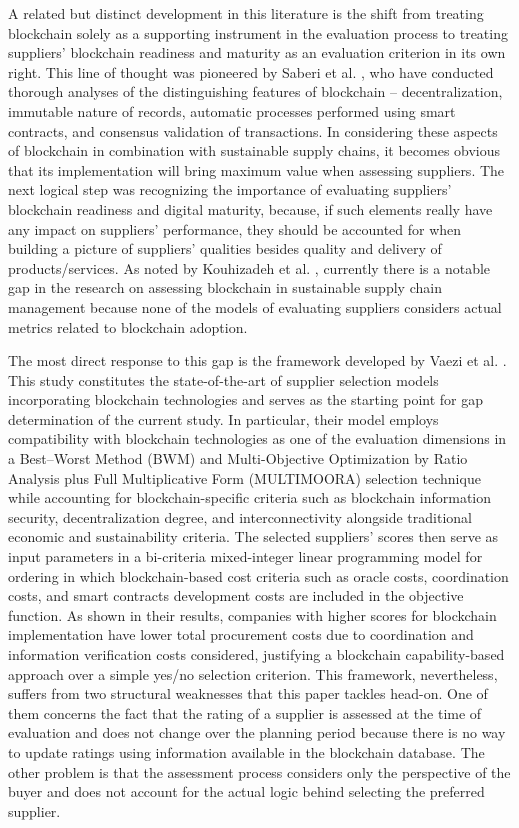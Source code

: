 \documentclass[11pt]{article}
\begin{document}
A related but distinct development in this literature is the shift from treating blockchain solely as a supporting instrument in the evaluation process to treating suppliers' blockchain readiness and maturity as an evaluation criterion in its own right. This line of thought was pioneered by Saberi et al. \cite{ref55}, who have conducted thorough analyses of the distinguishing features of blockchain -- decentralization, immutable nature of records, automatic processes performed using smart contracts, and consensus validation of transactions. In considering these aspects of blockchain in combination with sustainable supply chains, it becomes obvious that its implementation will bring maximum value when assessing suppliers. The next logical step was recognizing the importance of evaluating suppliers' blockchain readiness and digital maturity, because, if such elements really have any impact on suppliers' performance, they should be accounted for when building a picture of suppliers' qualities besides quality and delivery of products/services. As noted by Kouhizadeh et al. \cite{ref62}, currently there is a notable gap in the research on assessing blockchain in sustainable supply chain management because none of the models of evaluating suppliers considers actual metrics related to blockchain adoption.


The most direct response to this gap is the framework developed by Vaezi et al. \cite{ref63}. This study constitutes the state-of-the-art of supplier selection models incorporating blockchain technologies and serves as the starting point for gap determination of the current study. In particular, their model employs compatibility with blockchain technologies as one of the evaluation dimensions in a Best--Worst Method (BWM) and Multi-Objective Optimization by Ratio Analysis plus Full Multiplicative Form (MULTIMOORA) selection technique while accounting for blockchain-specific criteria such as blockchain information security, decentralization degree, and interconnectivity alongside traditional economic and sustainability criteria. The selected suppliers' scores then serve as input parameters in a bi-criteria mixed-integer linear programming model for ordering in which blockchain-based cost criteria such as oracle costs, coordination costs, and smart contracts development costs are included in the objective function. As shown in their results, companies with higher scores for blockchain implementation have lower total procurement costs due to coordination and information verification costs considered, justifying a blockchain capability-based approach over a simple yes/no selection criterion. This framework, nevertheless, suffers from two structural weaknesses that this paper tackles head-on. One of them concerns the fact that the rating of a supplier is assessed at the time of evaluation and does not change over the planning period because there is no way to update ratings using information available in the blockchain database. The other problem is that the assessment process considers only the perspective of the buyer and does not account for the actual logic behind selecting the preferred supplier.
\end{document}
